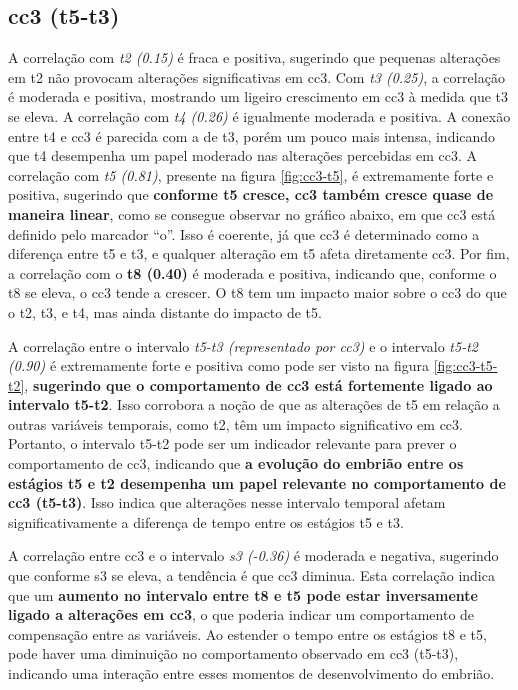 \subsection*{cc3 (t5-t3)}
A correlação com \textit{t2 (0.15)} é fraca e positiva, sugerindo que pequenas alterações em t2 não provocam alterações significativas em cc3. Com \textit{t3 (0.25)}, a correlação é moderada e positiva, mostrando um ligeiro crescimento em cc3 à medida que t3 se eleva. A correlação com \textit{t4 (0.26)} é igualmente moderada e positiva. A conexão entre t4 e cc3 é parecida com a de t3, porém um pouco mais intensa, indicando que t4 desempenha um papel moderado nas alterações percebidas em cc3. A correlação com \textit{t5 (0.81)}, presente na figura \ref{fig:cc3-t5}, é extremamente forte e positiva, sugerindo que \textbf{conforme t5 cresce, cc3 também cresce quase de maneira linear}, como se consegue observar no gráfico abaixo, em que cc3 está definido pelo marcador “o”. Isso é coerente, já que cc3 é determinado como a diferença entre t5 e t3, e qualquer alteração em t5 afeta diretamente cc3. Por fim, a correlação com o \textbf{t8 (0.40)} é moderada e positiva, indicando que, conforme o t8 se eleva, o cc3 tende a crescer. O t8 tem um impacto maior sobre o cc3 do que o t2, t3, e t4, mas ainda distante do impacto de t5.

A correlação entre o intervalo \textit{t5-t3 (representado por cc3)} e o intervalo \textit{t5-t2 (0.90)} é extremamente forte e positiva como pode ser visto na figura \ref{fig:cc3-t5-t2}, \textbf{sugerindo que o comportamento de cc3 está fortemente ligado ao intervalo t5-t2}. Isso corrobora a noção de que as alterações de t5 em relação a outras variáveis temporais, como t2, têm um impacto significativo em cc3. Portanto, o intervalo t5-t2 pode ser um indicador relevante para prever o comportamento de cc3, indicando que \textbf{a evolução do embrião entre os estágios t5 e t2 desempenha um papel relevante no comportamento de cc3 (t5-t3)}. Isso indica que alterações nesse intervalo temporal afetam significativamente a diferença de tempo entre os estágios t5 e t3. 

A correlação entre cc3 e o intervalo \textit{s3 (-0.36)} é moderada e negativa, sugerindo que conforme s3 se eleva, a tendência é que cc3 diminua. Esta correlação indica que um \textbf{aumento no intervalo entre t8 e t5 pode estar inversamente ligado a alterações em cc3}, o que poderia indicar um comportamento de compensação entre as variáveis. Ao estender o tempo entre os estágios t8 e t5, pode haver uma diminuição no comportamento observado em cc3 (t5-t3), indicando uma interação entre esses momentos de desenvolvimento do embrião.

